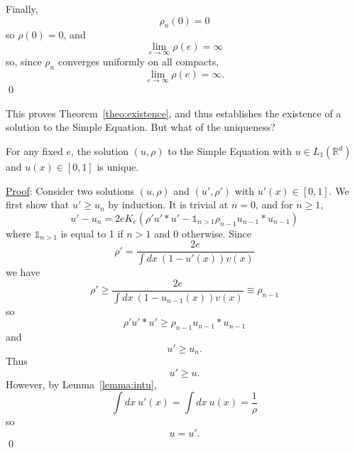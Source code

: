 \documentclass{ian}
\begin{document}
  \indent
  Finally,
  \begin{equation}
    \rho_n(0)=0
  \end{equation}
  so $\rho(0)=0$, and
  \begin{equation}
    \lim_{e\to\infty}\rho(e)=\infty
  \end{equation}
  so, since $\rho_n$ converges uniformly on all compacts,
  \begin{equation}
    \lim_{e\to\infty}\rho(e)=\infty
    .
  \end{equation}
\qed
\bigskip

\indent
This proves Theorem\-~\ref{theo:existence}, and thus establishes the existence of a solution to the Simple Equation.
But what of the uniqueness?
\bigskip

  For any fixed $e$, the solution $(u,\rho)$ to the Simple Equation with $u\in L_1(\mathbb R^d)$ and $u(x)\in[0,1]$ is unique.
\endtheo
\bigskip

\indent\underline{Proof}:
  Consider two solutions $(u,\rho)$ and $(u',\rho')$ with $u'(x)\in[0,1]$.
  We first show that $u'\geqslant u_n$ by induction.
  It is trivial at $n=0$, and for $n\geqslant 1$,
  \begin{equation}
    u'-u_n=2eK_e(\rho'u'\ast u'-\mathds 1_{n>1}\rho_{n-1}u_{n-1}\ast u_{n-1})
  \end{equation}
  where $\mathds 1_{n>1}$ is equal to 1 if $n>1$ and $0$ otherwise.
  Since
  \begin{equation}
    \rho'=\frac{2e}{\int dx\ (1-u'(x))v(x)}
  \end{equation}
  we have
  \begin{equation}
    \rho'\geqslant\frac{2e}{\int dx\ (1-u_{n-1}(x))v(x)}\equiv \rho_{n-1}
  \end{equation}
  so
  \begin{equation}
    \rho'u'\ast u'\geqslant\rho_{n-1}u_{n-1}\ast u_{n-1}
  \end{equation}
  and
  \begin{equation}
    u'\geqslant u_n
    .
  \end{equation}
  Thus
  \begin{equation}
    u'\geqslant u
    .
  \end{equation}
  However, by Lemma\-~\ref{lemma:intu},
  \begin{equation}
    \int dx\ u'(x)
    =\int dx\ u(x)=\frac1\rho
  \end{equation}
  so
  \begin{equation}
    u= u'
    .
  \end{equation}
\qed
\bigskip
\end{document}
